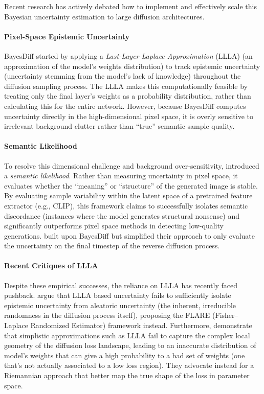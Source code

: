 Recent research has actively debated how to implement and effectively scale this Bayesian uncertainty estimation to large diffusion architectures.

\paragraph{Pixel-Space Epistemic Uncertainty} BayesDiff \parencite{kou_bayesdiff_2024} started by applying a \textit{Last-Layer Laplace Approximation} (\acs{LLLA}) (an approximation of the model's weights distribution) to track epistemic uncertainty (uncertainty stemming from the model's lack of knowledge) throughout the diffusion sampling process. The \acs{LLLA} makes this computationally feasible by treating only the final layer's weights as a probability distribution, rather than calculating this for the entire network. However, because BayesDiff computes uncertainty directly in the high-dimensional pixel space, it is overly sensitive to irrelevant background clutter rather than ``true'' semantic sample quality.

\paragraph{Semantic Likelihood} To resolve this dimensional challenge and background over-sensitivity, \cite{jazbec_generative_2025} introduced a \textit{semantic likelihood}. Rather than measuring uncertainty in pixel space, it evaluates whether the ``meaning'' or ``structure'' of the generated image is stable. By evaluating sample variability within the latent space of a pretrained feature extractor (e.g., \acs{CLIP}), this framework claims to successfully isolates semantic discordance (instances where the model generates structural nonsense) and significantly outperforms pixel space methods in detecting low-quality generations. \cite{jazbec_generative_2025} built upon BayesDiff but simplified their approach to only evaluate the uncertainty on the final timestep of the reverse diffusion process.

\paragraph{Recent Critiques of LLLA} Despite these empirical successes, the reliance on \acs{LLLA} has recently faced pushback. \cite{gupta_quantifying_2026} argue that \acs{LLLA} based uncertainty fails to sufficiently isolate epistemic uncertainty from aleatoric uncertainty (the inherent, irreducible randomness in the diffusion process itself), proposing the FLARE (Fisher–Laplace Randomized Estimator) framework instead. Furthermore, \cite{gegenfurtner_reducing_2026} demonstrate that simplistic approximations such as \acs{LLLA} fail to capture the complex local geometry of the diffusion loss landscape, leading to an inaccurate distribution of model's weights that can give a high probability to a bad set of weights (one that's not actually associated to a low loss region). They advocate instead for a Riemannian approach that better map the true shape of the loss in parameter space.

